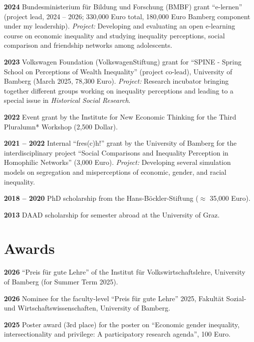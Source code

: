 \documentclass[margin]{res}
\begin{document}
\begin{resume}
	\textbf{2024} Bundesministerium f\"ur Bildung und Forschung (BMBF) grant ``e-lernen'' (project lead, 2024 -- 2026; 330,000 Euro total, 180,000 Euro Bamberg component under my leadership). \textit{Project:} Developing and evaluating an open e-learning course on economic inequality and studying inequality perceptions, social comparison and friendship networks among adolescents.
	
	\textbf{2023} Volkswagen Foundation (VolkswagenStiftung) grant for ``SPINE - Spring School on Perceptions of Wealth Inequality'' (project co-lead), University of Bamberg (March 2025, 78,300 Euro). \textit{Project:} Research incubator bringing together different groups working on inequality perceptions and leading to a special issue in \textit{Historical Social Research}.
	
	\textbf{2022} Event grant by the Institute for New Economic Thinking for the Third Pluralumn* Workshop (2,500 Dollar).
	
	\textbf{2021 -- 2022} Internal ``fres(c)h!'' grant by the University of Bamberg for the interdisciplinary project ``Social Comparisons and Inequality Perception in Homophilic Networks'' (3,000 Euro). \textit{Project:} Developing several simulation models on segregation and misperceptions of economic, gender, and racial inequality.
	
	\textbf{2018 -- 2020} PhD scholarship from the Hans-B\"ockler-Stiftung ($\approx$ 35,000 Euro).
	
	\textbf{2013} DAAD scholarship for semester abroad at the University of Graz.\\
	
	\section{Awards}
	\textbf{2026} ``Preis f\"ur gute Lehre'' of the Institut f\"ur Volkswirtschaftslehre, University of Bamberg (for Summer Term 2025).
	
	\textbf{2026} Nominee for the faculty-level ``Preis f\"ur gute Lehre'' 2025, Fakult\"at Sozial- und Wirtschaftswissenschaften, University of Bamberg.
	
	\textbf{2025} Poster award (3rd place) for the poster on ``Economic gender inequality, intersectionality and privilege: A participatory research agenda'', 100 Euro.
	

\end{resume}
\end{document}
